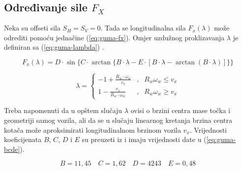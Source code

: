 \subsection{Određivanje sile $F_X$}

\qquad Neka su offseti sila $S_H=S_V=0$. Tada se longitudinalna sila $F_x(\lambda)$ može odrediti pomoću jednačine (\ref{eq:guma-fx}). Omjer uzdužnog proklizavanja $\lambda$ je definiran sa (\ref{eq:guma-lambda}) \citep{asiabar2019direct}.

\begin{equation}\label{eq:guma-fx}
F_x(\lambda) = D \cdot \sin \{ C \cdot \arctan \{B \cdot \lambda - E \cdot [B \cdot \lambda - \arctan (B \cdot \lambda )] \} \}
\end{equation}

\begin{equation}\label{eq:guma-lambda}
\lambda = 
\left\{
\begin{array}{ccc}
-1 + \frac{R_w \cdot \omega_w}{v_x} & , & R_w \omega_w \leq v_x \\
1 - \frac{v_x}{R_w \cdot \omega_w} & , & R_w \omega_w \geq v_x
\end{array}
\right.
\end{equation}

Treba napomenuti da u opštem slučaju $\lambda$ ovisi o brzini centra mase točka i geometriji samog vozila, ali da se u slučaju linearnog kretanja brzina centra kotača može aproksimirati longitudinalnom brzinom vozila $v_x$. Vrijednosti koeficijenata $B$, $C$, $D$ i $E$ su preuzeti iz \citep{li2015novel} i imaju vrijednosti date u (\ref{eq:guma-bcde}).

\begin{equation}\label{eq:guma-bcde}
B = 11,45 \quad C = 1,62 \quad D = 4243 \quad E = 0,48
\end{equation} 
